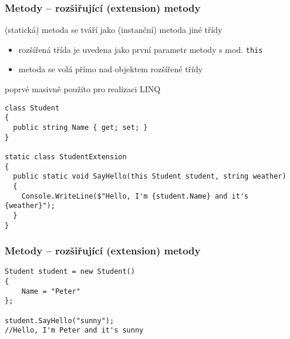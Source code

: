 \begin{frame}[fragile]
\frametitle{Metody -- rozšiřující (extension) metody}

\begin{bitemize}{}
\item (statická) metoda se tváří jako (instanční) metoda jiné třídy
\begin{itemize}
\item rozšířená třída je uvedena jako první parametr metody s mod. \lstinline|this|
\item metoda se volá přímo nad objektem rozšířené třídy
\end{itemize}

\item poprvé masivně použito pro realizaci LINQ
\end{bitemize}
\vfill
\begin{yesblock}
\begin{lstlisting}[basicstyle=\small]
class Student
{
  public string Name { get; set; }
}

static class StudentExtension
{
  public static void SayHello(this Student student, string weather)
  {
    Console.WriteLine($"Hello, I'm {student.Name} and it's {weather}");
  }
}
\end{lstlisting}
\end{yesblock}
\end{frame}

\begin{frame}[fragile]
\frametitle{Metody -- rozšiřující (extension) metody}
\begin{yesblock}
\begin{lstlisting}[basicstyle=\small]
Student student = new Student()
{
    Name = "Peter"
};

student.SayHello("sunny");
//Hello, I'm Peter and it's sunny
\end{lstlisting}
\end{yesblock}
\end{frame}


\zkouskove